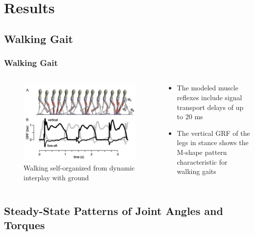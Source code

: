 \documentclass[10pt]{beamer}
\begin{document}
\section{Results}
\subsection[Results]{Walking Gait}

\begin{frame}
	\frametitle{Walking Gait}	
	
	\begin{columns}
		\begin{column}{.5\textwidth}
			\begin{figure}
				\centering
				\includegraphics[height=.45\textheight]{images/graphic_3.pdf}
				\caption{Walking self-organized from dynamic interplay with ground}	
			\end{figure}
		\end{column}
		\begin{column}{.5\textwidth}
			\begin{itemize}
				\item The modeled muscle reflexes include signal transport delays of up to 20 ms
				\item The vertical GRF of the legs in stance shows the M-shape pattern characteristic for walking gaits
			\end{itemize}
		\end{column}
	\end{columns}
\end{frame}

\subsection[Results]{Steady-State Patterns of Joint Angles and Torques}
\end{document}
